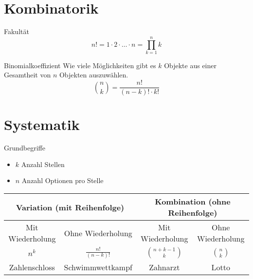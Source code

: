 \section{Kombinatorik}
\begin{definition}{Fakultät}
$$
n!=1 \cdot 2 \cdot \ldots \cdot n=\prod_{k=1}^{n} k
$$
\end{definition}

\begin{definition}{Binomialkoeffizient}
Wie viele Möglichkeiten gibt es $k$ Objekte aus einer Gesamtheit von $n$ Objekten auszuwählen.
$$
\binom{n}{k}=\frac{n!}{(n-k)!\cdot k!}
$$
\end{definition}

\section{Systematik}
\begin{concept}{Grundbegriffe}
\begin{itemize}
  \item $k$ Anzahl Stellen
  \item $n$ Anzahl Optionen pro Stelle
\end{itemize}

\begin{center}
\begin{tabular}{|c|c|c|c|}
\hline
\multicolumn{2}{|c|}{Variation (mit Reihenfolge)} & \multicolumn{2}{c|}{Kombination (ohne Reihenfolge)} \\
\hline
Mit Wiederholung & Ohne Wiederholung & Mit Wiederholung & Ohne Wiederholung \\
\hline
$n^{k}$ & $\frac{n!}{(n-k)!}$ & $\binom{n+k-1}{k}$ & $\binom{n}{k}$ \\
\hline
Zahlenschloss & Schwimmwettkampf & Zahnarzt & Lotto \\
\hline
\end{tabular}
\end{center}
\end{concept}

